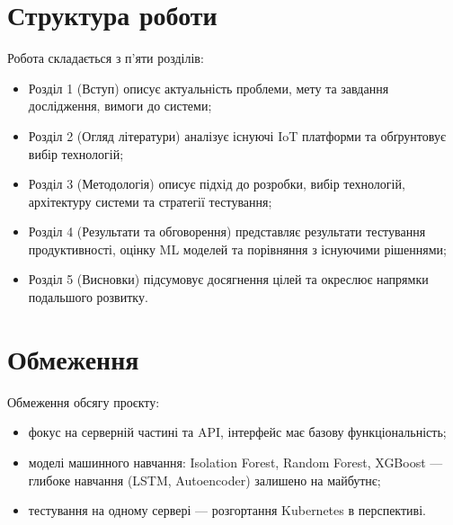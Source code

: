 \section{Структура роботи}

Робота складається з п'яти розділів:

\begin{itemize}
    \item Розділ 1 (Вступ) описує актуальність проблеми, мету та завдання дослідження, вимоги до системи;
    \item Розділ 2 (Огляд літератури) аналізує існуючі IoT платформи та обґрунтовує вибір технологій;
    \item Розділ 3 (Методологія) описує підхід до розробки, вибір технологій, архітектуру системи та стратегії тестування;
    \item Розділ 4 (Результати та обговорення) представляє результати тестування продуктивності, оцінку ML моделей та порівняння з існуючими рішеннями;
    \item Розділ 5 (Висновки) підсумовує досягнення цілей та окреслює напрямки подальшого розвитку.
\end{itemize}


\section{Обмеження}

Обмеження обсягу проєкту:

\begin{itemize}
    \item фокус на серверній частині та API, інтерфейс має базову функціональність;
    \item моделі машинного навчання: Isolation Forest, Random Forest, XGBoost --- глибоке навчання (LSTM, Autoencoder) залишено на майбутнє;
    \item тестування на одному сервері --- розгортання Kubernetes в перспективі.
\end{itemize}


